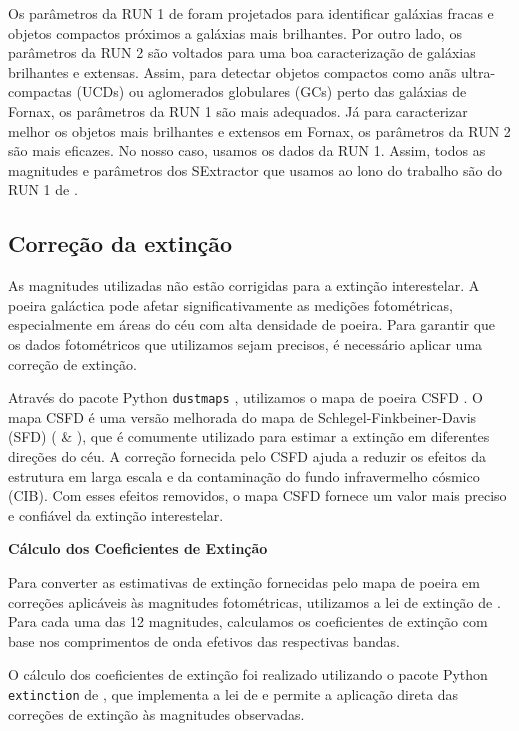 Os parâmetros da RUN 1 de \cite{haack2024splusfornaxprojectsfp} foram projetados para identificar galáxias fracas e objetos compactos próximos a galáxias mais brilhantes. Por outro lado, os parâmetros da RUN 2 são voltados para uma boa caracterização de galáxias brilhantes e extensas. Assim, para detectar objetos compactos como anãs ultra-compactas (UCDs) ou aglomerados globulares (GCs) perto das galáxias de Fornax, os parâmetros da RUN 1 são mais adequados. Já para caracterizar melhor os objetos mais brilhantes e extensos em Fornax, os parâmetros da RUN 2 são mais eficazes. No nosso caso, usamos os dados da RUN 1. Assim, todos as magnitudes e parâmetros dos SExtractor que usamos ao lono do trabalho são do RUN 1 de \cite{haack2024splusfornaxprojectsfp}.


\subsection{Correção da extinção}\label{sec:Coeficientes_ext}

As magnitudes utilizadas não estão corrigidas para a extinção interestelar. A poeira galáctica pode afetar significativamente as medições fotométricas, especialmente em áreas do céu com alta densidade de poeira. Para garantir que os dados fotométricos que utilizamos sejam precisos, é necessário aplicar uma correção de extinção.

Através do pacote Python \texttt{dustmaps} \citep{dustmapsGreen2018}, utilizamos o mapa de poeira CSFD \citep{chiang2023correctedsfdaccurategalactic}. O mapa CSFD é uma versão melhorada do mapa de Schlegel-Finkbeiner-Davis (SFD) (\citealt{Schlegel_1998} \& \citealt{Schlafly_2011}), que é comumente utilizado para estimar a extinção em diferentes direções do céu. A correção fornecida pelo CSFD ajuda a reduzir os efeitos da estrutura em larga escala e da contaminação do fundo infravermelho cósmico (CIB). Com esses efeitos removidos, o mapa CSFD fornece um valor mais preciso e confiável da extinção interestelar.

\textbf{Cálculo dos Coeficientes de Extinção}

Para converter as estimativas de extinção fornecidas pelo mapa de poeira em correções aplicáveis às magnitudes fotométricas, utilizamos a lei de extinção de \cite{cardelli1989dust}. Para cada uma das 12 magnitudes, calculamos os coeficientes de extinção com base nos comprimentos de onda efetivos das respectivas bandas.

\sloppy
O cálculo dos coeficientes de extinção foi realizado utilizando o pacote Python \texttt{extinction} de \cite{barbary2017extinction}, que implementa a lei de \cite{cardelli1989dust} e permite a aplicação direta das correções de extinção às magnitudes observadas.

